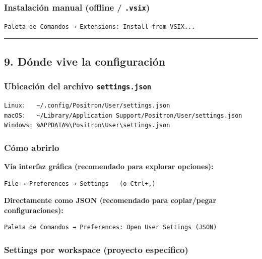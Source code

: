 \documentclass[
  doc,
  floatsintext,
  longtable,
  a4paper,
  nolmodern,
  notxfonts,
  notimes,
  12pt,
  colorlinks=true,linkcolor=blue,citecolor=blue,urlcolor=blue]{apa7}
\begin{document}
\subsubsection{\texorpdfstring{Instalación manual (offline /
\texttt{.vsix})}{Instalación manual (offline / .vsix)}}\label{instalaciuxf3n-manual-offline-.vsix}

\begin{verbatim}
Paleta de Comandos → Extensions: Install from VSIX...
\end{verbatim}

\begin{center}\rule{0.5\linewidth}{0.5pt}\end{center}

\subsection{9. Dónde vive la
configuración}\label{duxf3nde-vive-la-configuraciuxf3n}

\subsubsection{\texorpdfstring{Ubicación del archivo
\texttt{settings.json}}{Ubicación del archivo settings.json}}\label{ubicaciuxf3n-del-archivo-settings.json}

\begin{verbatim}
Linux:   ~/.config/Positron/User/settings.json
macOS:   ~/Library/Application Support/Positron/User/settings.json
Windows: %APPDATA%\Positron\User\settings.json
\end{verbatim}

\subsubsection{Cómo abrirlo}\label{cuxf3mo-abrirlo}

\textbf{Vía interfaz gráfica (recomendado para explorar opciones):}

\begin{verbatim}
File → Preferences → Settings   (o Ctrl+,)
\end{verbatim}

\textbf{Directamente como JSON (recomendado para copiar/pegar
configuraciones):}

\begin{verbatim}
Paleta de Comandos → Preferences: Open User Settings (JSON)
\end{verbatim}

\subsubsection{Settings por workspace (proyecto
específico)}\label{settings-por-workspace-proyecto-especuxedfico}
\end{document}
